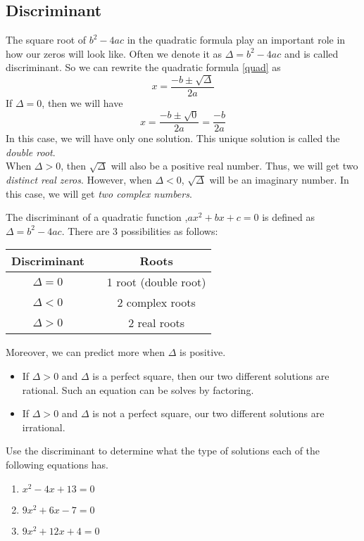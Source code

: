 \subsection{Discriminant}
The square root of $b^2-4ac$ in the quadratic formula play an important role in how our zeros
will look like. Often we denote it as $\Delta=b^2-4ac$ and is called discriminant. So we can
rewrite the quadratic formula \eqref{quad} as\[
					x =\frac{-b \pm \sqrt{\Delta}}{2a}
											\]
If $\Delta=0$,  then we will have \[
					x =\frac{-b \pm \sqrt{0}}{2a}=\frac{-b}{2a}
\]
In this case, we will have only one solution. This unique solution is called the \textit{double root}.\\
When $\Delta>0$, then $\sqrt{\Delta}$ will also be a positive real number. Thus, we will get two 
\textit{distinct real zeros}. However, when $\Delta<0$, $\sqrt{\Delta}$ will be an imaginary
number. In this case, we will get \textit{two complex numbers}.
\begin{tcolorbox}[
                    title={Discriminant $\bm{\Delta}$},
                    fonttitle=\bfseries,
                    colframe=blue!50!red,
                    colback=white
                    ]
The discriminant of a quadratic function ,$ax^2+bx+c=0$ is defined as $\Delta=b^2-4ac$. There are 3 possibilities as follows:
	\begin{center}
	\begin{tabular}{ c c c}
		Discriminant & & Roots \\
		\hline \hline
		$\Delta=0$ & & 1 root (double root) \\
		$\Delta<0$ & & 2 complex roots \\
		$\Delta>0$ & & 2 real roots \\
		\bottomrule
	\end{tabular}
	\end{center}
\end{tcolorbox}
Moreover, we can predict more when $\Delta$ is positive. 
\begin{itemize}
	\item If $\Delta>0$ and $\Delta$ is a perfect square, then our two different
			 solutions are rational. Such an equation can be solves by factoring.
	\item If $\Delta>0$ and $\Delta$ is not a perfect square, our two different solutions
			are irrational.
\end{itemize}
\begin{exa}
	Use the discriminant to determine what the type of solutions each of the following equations
	has.
	\begin{enumerate}[\bfseries (a)]
	    \item $x^2-4x+13=0$ 
	    \item $9x^2+6x-7=0$
	    \item $9x^2+12x+4=0$
	\end{enumerate}
\end{exa}
